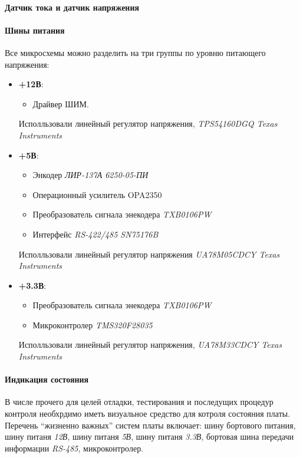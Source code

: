 \paragraph{Датчик тока и датчик напряжения}
\paragraph{Шины питания}
Все микросхемы можно разделить на три группы по уровню питающего напряжения:
\begin{itemize}
    \item \textbf{+12В}:
        \begin{itemize}
            \item Драйвер ШИМ.
        \end{itemize}
        Исполльзовали линейный регулятор напряжения, \textit{TPS54160DGQ Texas Instruments}
    \item \textbf{+5В}:
        \begin{itemize}
            \item Энкодер \textit{ЛИР-137А 6250-05-ПИ}
            \item Операционный усилитель OPA2350
            \item Преобразователь сигнала энекодера \textit{TXB0106PW}
            \item Интерфейс \textit{RS-422/485 SN75176B}
        \end{itemize}
        Исполльзовали линейный регулятор напряжения \textit{UA78M05CDCY Texas Instruments}
    \item \textbf{+3.3В}:
        \begin{itemize}
            \item Преобразователь сигнала энекодера \textit{TXB0106PW}
            \item Микроконтролер \textit{TMS320F28035}
        \end{itemize}
        Исполльзовали линейный регулятор напряжения, \textit{UA78M33CDCY Texas Instruments}
\end{itemize}

\paragraph{Индикация состояния}
В числе прочего для целей отладки, тестирования и последущих процедур контроля
необхрдимо иметь визуальное средство для котроля состояния платы.
Перечень ``жизненно важных'' систем платы включает:
шину бортового питания,
шину питаня \textit{12В},
шину питаня \textit{5В},
шину питаня \textit{3.3В},
бортовая шина передачи информации \textit{RS-485},
микроконтролер.

